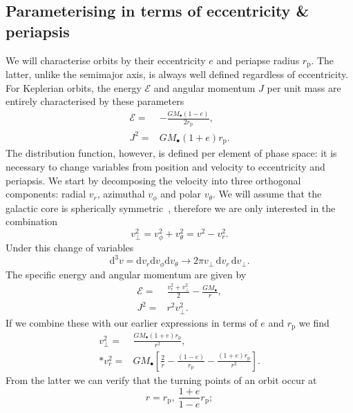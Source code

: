 \documentclass[useAMS,usedcolumn,usegraphicx,usenatbib]{mn2e}
\newcommand{\sub}[1]{\ensuremath{_\mathrm{#1}}}
\newcommand{\dd}{\ensuremath{\mathrm{d}}}
\begin{document}
\subsection{Parameterising in terms of eccentricity \& periapsis}

We will characterise orbits by their eccentricity $e$ and periapse radius $r\sub{p}$. The latter, unlike the semimajor axis, is always well defined regardless of eccentricity. For Keplerian orbits, the energy $\mathcal{E}$ and angular momentum $J$ per unit mass are entirely characterised by these parameters
\begin{align}
\label{eq:Energy_ecc}
\mathcal{E} = {} & -\frac{GM_\bullet(1 - e)}{2r\sub{p}},\\
J^2 = {} & GM_\bullet(1 + e)r\sub{p}.
\end{align}
The distribution function, however, is defined per element of phase space: it is necessary to change variables from position and velocity to eccentricity and periapsis. We start by decomposing the velocity into three orthogonal components: radial $v_r$, azimuthal $v_\phi$ and polar $v_\theta$. We will assume that the galactic core is spherically symmetric~\citep{Genzel2003, Schodel2007}, therefore we are only interested in the combination
\begin{equation}
v_\perp^2 = v_\phi^2 + v_\theta^2 = v^2 - v_r^2.
\end{equation}
Under this change of variables
\begin{equation}
\dd^3v = \dd v_r \dd v_\phi \dd v_\theta \rightarrow 2\pi v_\perp \,\dd v_r \,\dd v_\perp.
\end{equation}
The specific energy and angular momentum are given by
\begin{align}
\mathcal{E} = {} & \frac{v_r^2 + v_\perp^2}{2} - \frac{GM_\bullet}{r},\\
J^2 = {} & r^2 v_\perp^2.
\end{align}
If we combine these with our earlier expressions in terms of $e$ and $r\sub{p}$ we find
\begin{align}
v_\perp^2 = {} & \frac{GM_\bullet(1 + e)r\sub{p}}{r^2}, \nonumber \\*
v_r^2 = {} & GM_\bullet\left[\frac{2}{r} - \frac{(1 - e)}{r\sub{p}} - \frac{(1 + e)r\sub{p}}{r^2}\right].
\end{align}
From the latter we can verify that the turning points of an orbit occur at
\begin{equation}
r = r\sub{p}, \: \frac{1+e}{1-e}r\sub{p};
\end{equation}
\end{document}
